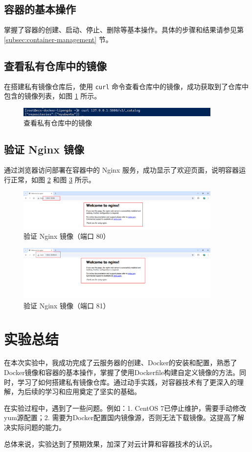 \documentclass{article}
\begin{document}
\subsection{容器的基本操作}

掌握了容器的创建、启动、停止、删除等基本操作。具体的步骤和结果请参见第 \ref{subsec:container-management} 节。

\subsection{查看私有仓库中的镜像}

在搭建私有镜像仓库后，使用 \texttt{curl} 命令查看仓库中的镜像，成功获取到了仓库中包含的镜像列表，如图 \ref{fig:registry-images} 所示。

\begin{figure}[H]
\centering
\includegraphics[width=0.9\textwidth]{img/0.2.5.1.5.png}
\caption{查看私有仓库中的镜像}
\label{fig:registry-images}
\end{figure}

\subsection{验证 Nginx 镜像}

通过浏览器访问部署在容器中的 Nginx 服务，成功显示了欢迎页面，说明容器运行正常，如图 \ref{fig:nginx-welcome} 和图 \ref{fig:nginx-welcome-2} 所示。

\begin{figure}[H]
\centering
\includegraphics[width=0.9\textwidth]{img/0.2.7.2.2.png}
\caption{验证 Nginx 镜像（端口 80）}
\label{fig:nginx-welcome}
\end{figure}

\begin{figure}[H]
\centering
\includegraphics[width=0.9\textwidth]{img/0.2.7.3.4.png}
\caption{验证 Nginx 镜像（端口 81）}
\label{fig:nginx-welcome-2}
\end{figure}

\section{实验总结}

在本次实验中，我成功完成了云服务器的创建、Docker的安装和配置，熟悉了Docker镜像和容器的基本操作，掌握了使用Dockerfile构建自定义镜像的方法。同时，学习了如何搭建私有镜像仓库。通过动手实践，对容器技术有了更深入的理解，为后续的学习和应用奠定了坚实的基础。

在实验过程中，遇到了一些问题。例如：1. CentOS 7已停止维护，需要手动修改yum源配置；2. 需要为Docker配置国内镜像源，否则无法下载镜像。这提高了解决实际问题的能力。

总体来说，实验达到了预期效果，加深了对云计算和容器技术的认识。
\end{document}
